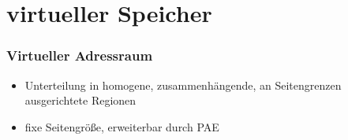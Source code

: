 \documentclass[ddcfooter,nosectionnum]{tudbeamer}
\begin{document}
%   
%       





\section{virtueller Speicher}
\begin{frame}
    \frametitle{Virtueller Adressraum}
    \begin{itemize}
         \item   Unterteilung in homogene, zusammenhängende, an Seitengrenzen ausgerichtete 			Regionen
         \item fixe Seitengröße, erweiterbar durch PAE
        
     \end{itemize}
    
\end{frame}
\end{document}

